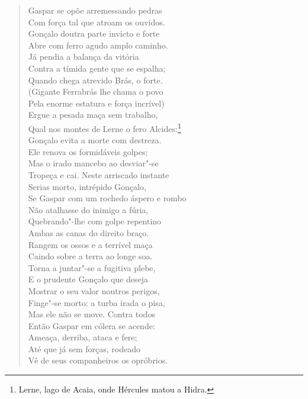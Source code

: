 \begin{verse}
Gaspar se opõe arremessando pedras\\
Com força tal que atroam os ouvidos.\\
Gonçalo doutra parte invicto e forte\\
Abre com ferro agudo amplo caminho.\\
Já pendia a balança da vitória\\
Contra a tímida gente que se espalha;\\
Quando chega atrevido Brás, o forte.\\
(Gigante Ferrabrás lhe chama o povo\\
Pela enorme estatura e força incrível)\\
Ergue a pesada maça sem trabalho,\\
Qual nos montes de Lerne o fero Alcides:\footnote{ Lerne, lago de Acaia, onde Hércules matou a Hidra.}\\	\index{\Alcid}
Gonçalo evita a morte com destreza.\\
Ele renova os formidáveis golpes;\\
Mas o irado mancebo ao desviar"-se\\
Tropeça e cai. Neste arriscado instante\\
Serias morto, intrépido Gonçalo,\\
Se Gaspar com um rochedo áspero e rombo\\
Não atalhasse do inimigo a fúria,\\
Quebrando"-lhe com golpe repentino\\
Ambas as canas do direito braço.\\
Rangem os ossos e a terrível maça\\
Caindo sobre a terra ao longe soa.\\
Torna a juntar"-se a fugitiva plebe,\\
E o prudente Gonçalo que deseja\\
Mostrar o seu valor noutros perigos,\\
Finge"-se morto: a turba irada o pisa,\\
Mas ele não se move. Contra todos\\
Então Gaspar em cólera se acende:\\
Ameaça, derriba, ataca e fere;\\
Até que já sem forças, rodeado\\
Vê de seus companheiros os opróbrios. \\[10pt]



\end{verse}
